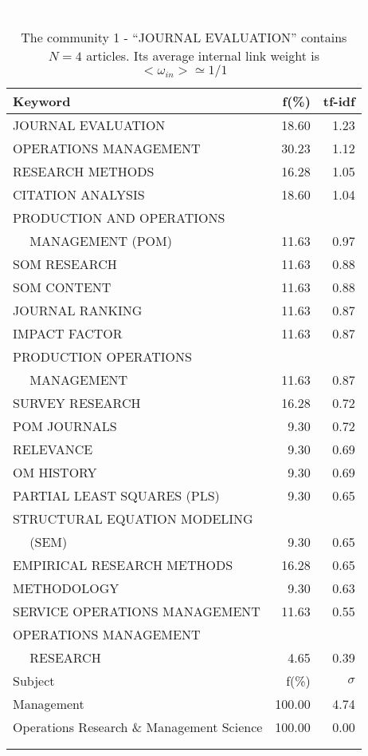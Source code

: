 \documentclass[a4paper,11pt]{report}
\begin{document}
\begin{landscape}
\clearpage

\begin{table}[!ht]
\caption{The community 1 - ``JOURNAL EVALUATION'' contains $N = 4$ articles. Its average internal link weight is $<\omega_{in}> \simeq 1/1$ }
\textcolor{white}{aa}\\
{\scriptsize\begin{tabular}{|l r  r|}
\hline
Keyword & f(\%) & tf-idf \\
\hline
JOURNAL EVALUATION & 18.60 & 1.23\\
OPERATIONS MANAGEMENT & 30.23 & 1.12\\
RESEARCH METHODS & 16.28 & 1.05\\
CITATION ANALYSIS & 18.60 & 1.04\\
PRODUCTION AND OPERATIONS &  &\\
$\quad$ MANAGEMENT (POM) & 11.63 & 0.97\\
SOM RESEARCH & 11.63 & 0.88\\
SOM CONTENT & 11.63 & 0.88\\
JOURNAL RANKING & 11.63 & 0.87\\
IMPACT FACTOR & 11.63 & 0.87\\
PRODUCTION OPERATIONS &  &\\
$\quad$ MANAGEMENT & 11.63 & 0.87\\
SURVEY RESEARCH & 16.28 & 0.72\\
POM JOURNALS & 9.30 & 0.72\\
RELEVANCE & 9.30 & 0.69\\
OM HISTORY & 9.30 & 0.69\\
PARTIAL LEAST SQUARES (PLS) & 9.30 & 0.65\\
STRUCTURAL EQUATION MODELING &  &\\
$\quad$ (SEM) & 9.30 & 0.65\\
EMPIRICAL RESEARCH METHODS & 16.28 & 0.65\\
METHODOLOGY & 9.30 & 0.63\\
SERVICE OPERATIONS MANAGEMENT & 11.63 & 0.55\\
OPERATIONS MANAGEMENT &  &\\
$\quad$ RESEARCH & 4.65 & 0.39\\
\hline
\hline
Subject & f(\%) & $\sigma$\\
\hline
Management & 100.00 & 4.74\\
Operations Research \& Management Science & 100.00 & 0.00\\
 &  & \\
 &  & \\

\end{tabular}}
\end{table}
\end{landscape}
\end{document}
